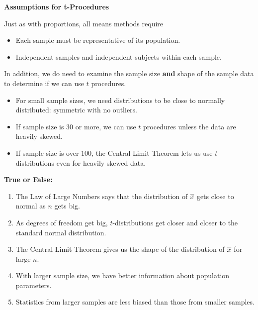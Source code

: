 

\begin{center}
  {\large\bf Assumptions for t-Procedures}
\end{center}

  Just as with proportions, all means methods require 
  \begin{itemize}
     \item Each sample must be representative of its population. 
     \item Independent samples and independent subjects within each
       sample.
  \end{itemize}
   In addition, we do need to examine the sample size {\bf and} shape
   of the sample data to determine if we can use $t$ procedures.
   \begin{itemize}
   \item For small sample sizes, we need distributions to be close to
     normally distributed: symmetric with no outliers.
   \item If sample size is 30 or more, we can use $t$ procedures
     unless the data are heavily skewed.
   \item If sample size is over 100, the Central Limit Theorem lets us
     use $t$ distributions even for heavily skewed data.
   \end{itemize}

   \begin{center}
     {\large\bf True or False:}
   \end{center}
   \begin{enumerate}
   \item \underline{\hspace{.5in}} The Law of Large Numbers says that the
     distribution of $\overline{x}$  gets close to normal as $n$ gets big. 
   \item \underline{\hspace{.5in}} As degrees of freedom get big,
     $t$-distributions get 
     closer and closer to the standard normal distribution.
   \item \underline{\hspace{.5in}} The Central Limit Theorem gives us the shape of
     the distribution of $\overline{x}$ for large $n$.
   \item \underline{\hspace{.5in}}  With larger sample size, we have better
     information about population parameters.
   \item \underline{\hspace{.5in}} Statistics from larger samples are less biased
     than those from smaller samples.
   \end{enumerate}

